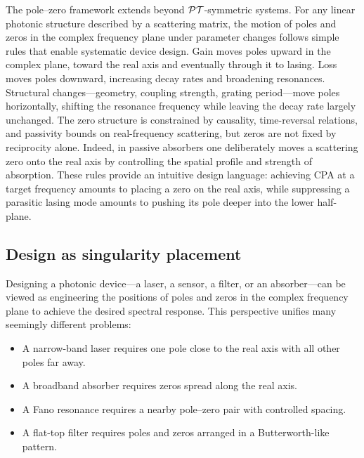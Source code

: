 The pole--zero framework extends beyond $\mathcal{PT}$-symmetric systems. For
any linear photonic structure described by a scattering matrix, the
motion of poles and zeros in the complex frequency plane under parameter
changes follows simple rules that enable systematic device design.
Gain moves poles upward in the complex plane, toward the real axis and
eventually through it to lasing. Loss moves poles downward, increasing
decay rates and broadening resonances. Structural changes---geometry,
coupling strength, grating period---move poles horizontally, shifting
the resonance frequency while leaving the decay rate largely unchanged.
The zero structure is constrained by causality, time-reversal relations,
and passivity bounds on real-frequency scattering, but zeros are not
fixed by reciprocity alone. Indeed, in passive absorbers one deliberately
moves a scattering zero onto the real axis by controlling the spatial
profile and strength of absorption.
These rules provide an intuitive design language: achieving CPA at a
target frequency amounts to placing a zero on the real axis, while
suppressing a parasitic lasing mode amounts to pushing its pole deeper
into the lower half-plane.

\subsection{Design as singularity placement}
\label{ssec:design-singularity}

Designing a photonic device---a laser, a sensor, a filter, or an
absorber---can be viewed as engineering the positions of poles and zeros
in the complex frequency plane to achieve the desired spectral response.
This perspective unifies many seemingly different problems:
\begin{itemize}
 \item A narrow-band laser requires one pole close to the real axis with
 all other poles far away.
 \item A broadband absorber requires zeros spread along the real axis.
 \item A Fano resonance requires a nearby pole--zero pair with
 controlled spacing.
 \item A flat-top filter requires poles and zeros arranged in a
 Butterworth-like pattern.
\end{itemize}

